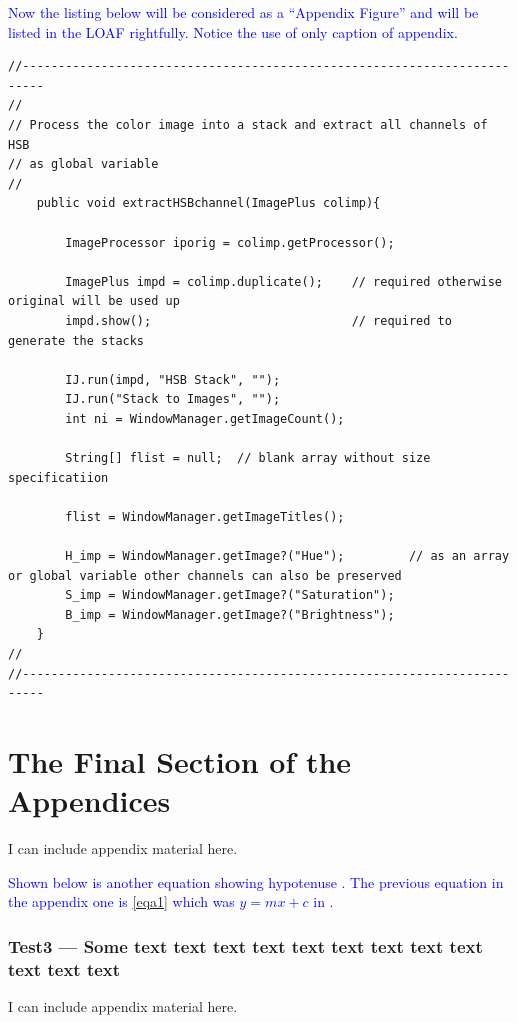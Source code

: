 \documentclass[phd]{ndsu-thesis-2022}
\newcommand\italk[1]{\textcolor{blue}{#1}}  %
\begin{document}
\italk{Now the listing below will be considered as a ``Appendix Figure'' and will be listed in the LOAF rightfully. Notice the use of only caption of appendix.}

{\singlespacing
\begin{lstlisting}
//-------------------------------------------------------------------------
//
// Process the color image into a stack and extract all channels of HSB 
// as global variable
//
	public void extractHSBchannel(ImagePlus colimp){

		ImageProcessor iporig = colimp.getProcessor();
		
		ImagePlus impd = colimp.duplicate();	// required otherwise original will be used up
		impd.show();						    // required to generate the stacks
		
		IJ.run(impd, "HSB Stack", "");
		IJ.run("Stack to Images", "");
		int ni = WindowManager.getImageCount();

		String[] flist = null;  // blank array without size specificatiion

		flist = WindowManager.getImageTitles();
		
		H_imp = WindowManager.getImage?("Hue");			// as an array or global variable other channels can also be preserved
		S_imp = WindowManager.getImage?("Saturation");
		B_imp = WindowManager.getImage?("Brightness");
	}	
//
//-------------------------------------------------------------------------	
\end{lstlisting}
}


\newpage
\section{The Final Section of the Appendices}
I can include appendix material here. 

\italk{Shown below is another equation showing hypotenuse \Cref{eqc1}. The previous equation in the appendix one is \cref{eqa1} which was $y = mx + c$ in \cpageref{eqa1}. } 
 

\subsubsection{Test3 --- Some text text text text text text text text text text text text}
I can include appendix material here. 
\end{document}
